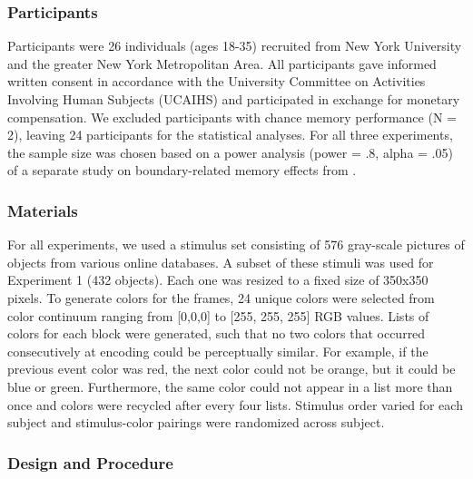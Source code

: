 \subsubsection{Participants}\label{participants}

Participants were 26 individuals (ages 18-35) recruited from New York
University and the greater New York Metropolitan Area. All participants
gave informed written consent in accordance with the University
Committee on Activities Involving Human Subjects (UCAIHS) and
participated in exchange for monetary compensation. We excluded
participants with chance memory performance (N = 2), leaving 24
participants for the statistical analyses. For all three experiments,
the sample size was chosen based on a power analysis (power = .8, alpha
= .05) of a separate study on boundary-related memory effects from
\textcite{dubrow_influence_2013}.

\subsubsection{Materials}\label{materials}

For all experiments, we used a stimulus set consisting of 576 gray-scale
pictures of objects from various online databases. A subset of these
stimuli was used for Experiment 1 (432 objects). Each one was resized to
a fixed size of 350x350 pixels. To generate colors for the frames, 24
unique colors were selected from color continuum ranging from
{[}0,0,0{]} to {[}255, 255, 255{]} RGB values. Lists of colors for each
block were generated, such that no two colors that occurred
consecutively at encoding could be perceptually similar. For example, if
the previous event color was red, the next color could not be orange,
but it could be blue or green. Furthermore, the same color could not
appear in a list more than once and colors were recycled after every
four lists. Stimulus order varied for each subject and stimulus-color
pairings were randomized across subject.

\subsubsection{Design and Procedure}\label{design-and-procedure}

